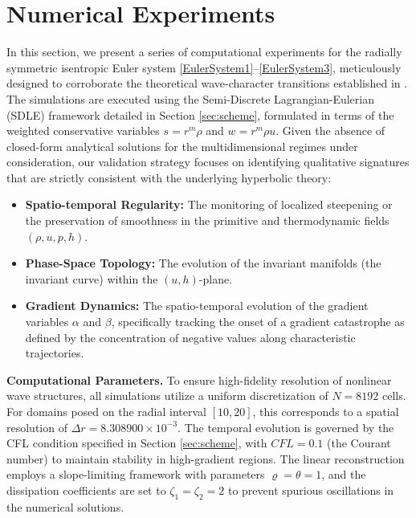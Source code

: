 \documentclass[11pt]{article}
\begin{document}
\section{Numerical Experiments}\label{sec:experiments}


In this section, we present a series of computational experiments for the radially symmetric isentropic Euler system \eqref{EulerSystem1}--\eqref{EulerSystem3}, meticulously designed to corroborate the theoretical wave-character transitions established in \cite{F1}. The simulations are executed using the Semi-Discrete Lagrangian-Eulerian (SDLE) framework detailed in Section \ref{sec:scheme}, formulated in terms of the weighted conservative variables $s=r^m\rho$ and $w=r^m\rho u$. Given the absence of closed-form analytical solutions for the multidimensional regimes under consideration, our validation strategy focuses on identifying qualitative signatures that are strictly consistent with the underlying hyperbolic theory:
%
\begin{itemize}
\item[1)] \textbf{Spatio-temporal Regularity:} The monitoring of localized steepening or the preservation of smoothness in the primitive and thermodynamic fields $(\rho,u,p,h)$.

\item[2)] \textbf{Phase-Space Topology:} The evolution of the invariant manifolds (the invariant curve) within the $(u,h)$-plane.

\item[3)] \textbf{Gradient Dynamics:} The spatio-temporal evolution of the gradient variables $\alpha$ and $\beta$, specifically tracking the onset of a gradient catastrophe as defined by the concentration of negative values along characteristic trajectories.
\end{itemize}

\textbf{Computational Parameters.} To ensure high-fidelity resolution of nonlinear wave structures, all simulations utilize a uniform discretization of $N=8192$ cells. For domains posed on the radial interval $[10,20]$, this corresponds to a spatial resolution of $\Delta r = 8.308900\times 10^{-3}$. The temporal evolution is governed by the CFL condition specified in Section \ref{sec:scheme}, with $CFL=0.1$ (the Courant number) to maintain stability in high-gradient regions. The linear reconstruction employs a slope-limiting framework with parameters $\varrho = \theta=1$, and the dissipation coefficients are set to $\zeta_1 = \zeta_{2} = 2$ to prevent spurious oscillations in the numerical solutions.
\end{document}
